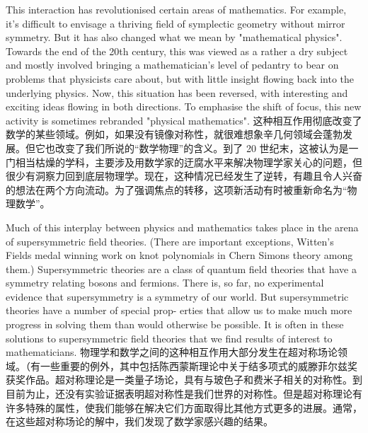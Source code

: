 \documentclass{article}
\begin{document}
\begin{paracol}{2}
This interaction has revolutionised certain areas of mathematics. For example, it's difficult to envisage a thriving field of symplectic geometry without mirror symmetry. But it has also changed what we mean by "mathematical physics". Towards the end of the 20th century, this was viewed as a rather a dry subject and mostly involved bringing a mathematician's level of pedantry to bear on problems that physicists care about, but with little insight flowing back into the underlying physics. Now, this situation has been reversed, with interesting and exciting ideas flowing in both directions. To emphasise the shift of focus, this new activity is sometimes rebranded "physical mathematics".
\switchcolumn
这种相互作用彻底改变了数学的某些领域。例如，如果没有镜像对称性，就很难想象辛几何领域会蓬勃发展。但它也改变了我们所说的“数学物理”的含义。到了 20 世纪末，这被认为是一门相当枯燥的学科，主要涉及用数学家的迂腐水平来解决物理学家关心的问题，但很少有洞察力回到底层物理学。现在，这种情况已经发生了逆转，有趣且令人兴奋的想法在两个方向流动。为了强调焦点的转移，这项新活动有时被重新命名为“物理数学”。
\switchcolumn*

Much of this interplay between physics and mathematics takes place in the arena of supersymmetric field theories. (There are important exceptions, Witten's Fields medal winning work on knot polynomials in Chern Simons theory among them.) Supersymmetric theories are a class of quantum field theories that have a symmetry relating bosons and fermions. There is, so far, no experimental evidence that supersymmetry is a symmetry of our world. But supersymmetric theories have a number of special prop- erties that allow us to make much more progress in solving them than would otherwise be possible. It is often in these solutions to supersymmetric field theories that we find results of interest to mathematicians.
\switchcolumn
物理学和数学之间的这种相互作用大部分发生在超对称场论领域。（有一些重要的例外，其中包括陈西蒙斯理论中关于结多项式的威滕菲尔兹奖获奖作品。超对称理论是一类量子场论，具有与玻色子和费米子相关的对称性。到目前为止，还没有实验证据表明超对称性是我们世界的对称性。但是超对称理论有许多特殊的属性，使我们能够在解决它们方面取得比其他方式更多的进展。通常，在这些超对称场论的解中，我们发现了数学家感兴趣的结果。
\switchcolumn*


\end{paracol}
\end{document}
